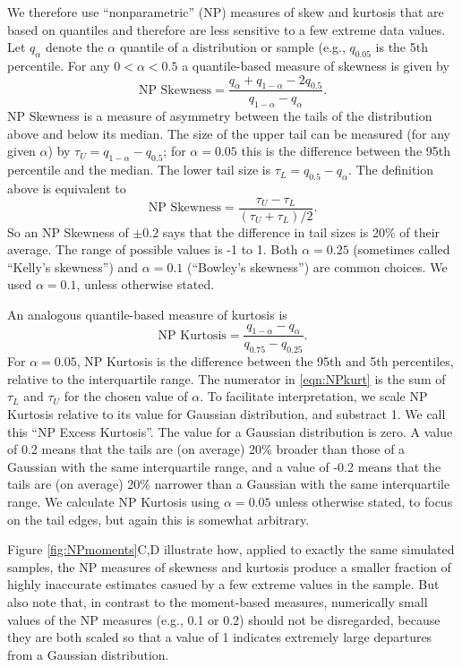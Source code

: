 \documentclass[11pt]{article}
\newcounter{box}
\newcommand{\be}{\begin{equation}}
\newcommand{\ee}{\end{equation}}
\begin{document}
{We therefore use ``nonparametric'' (NP) measures of skew and kurtosis that are based on quantiles and therefore are 
less sensitive to a few extreme data values. Let $q_\alpha$ denote the $\alpha$ quantile of a distribution or sample (e.g., $q_{0.05}$ 
is the 5th percentile. For any $0 < \alpha < 0.5$ a quantile-based measure of skewness is given by \citep{mcgillivray-1986}
\be
\mbox{NP Skewness} = \frac{q_\alpha + q_{1-\alpha} - 2 q_{0.5}}{q_{1-\alpha} - q_\alpha}.
\ee
NP Skewness is a measure of asymmetry between the tails of the distribution above and below its median. The size of the upper
tail can be measured (for any given $\alpha$) by $\tau_U = q_{1-\alpha} - q_{0.5}$; for $\alpha=0.05$ this is the difference
between the 95th percentile and the median. The lower tail size is $\tau_L = q_{0.5} - q_\alpha$. The definition above
is equivalent to  
\be
\mbox{NP Skewness} = \frac{\tau_U - \tau_L}{(\tau_U + \tau_L)/2}.
\label{eqn:NPskew}
\ee
So an NP Skewness of $\pm 0.2$ says that the difference in tail sizes is 20\% of their average. The range of possible values 
is -1 to 1. Both $\alpha=0.25$ (sometimes called ``Kelly's skewness'') and $\alpha=0.1$ (``Bowley's skewness'') 
are common choices. We used $\alpha=0.1$, unless otherwise stated.  
 
An analogous quantile-based measure of kurtosis \citep{jones-etal-1994} is 
\be
\mbox{NP Kurtosis}  = \frac{q_{1-\alpha} - q_{\alpha}}{q_{0.75} - q_{0.25}}.
\label{eqn:NPkurt}
\ee
For $\alpha=0.05$, NP Kurtosis is the difference between the 95th and 5th percentiles, relative to the interquartile range. 
The numerator in \eqref{eqn:NPkurt} is the sum of $\tau_L$ and $\tau_U$ for the chosen value of $\alpha$. 
To facilitate interpretation, we scale NP Kurtosis relative to its value for Gaussian distribution, and substract 1. 
We call this ``NP Excess Kurtosis''. The value for a Gaussian distribution is zero. A value of 0.2 means that the tails
are (on average) 20\% broader than those of a Gaussian with the same interquartile range, and a value of -0.2 means that the tails
are (on average) 20\% narrower than a Gaussian with the same interquartile range. We calculate NP Kurtosis using $\alpha=0.05$ 
unless otherwise stated, to focus on the tail edges, but again this is somewhat arbitrary. 

Figure \ref{fig:NPmoments}C,D illustrate how, applied to exactly the same simulated samples, the NP measures of skewness and
kurtosis produce a smaller fraction of highly inaccurate estimates casued by a few extreme values in the sample. But also note
that, in contrast to the moment-based measures, numerically small values of the NP measures (e.g., 0.1 or 0.2) should not be
disregarded, because they are both scaled so that a value of 1 indicates extremely large departures from a Gaussian distribution. 

}
\end{document}
